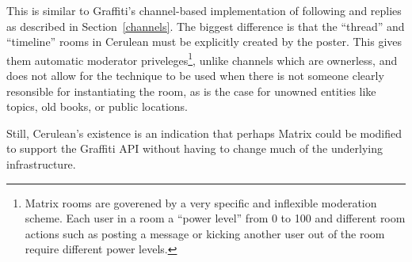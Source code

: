 

This is similar to Graffiti's channel-based implementation of following
and replies as described in Section~\ref{channels}.
The biggest difference is that the ``thread'' and ``timeline'' rooms
in Cerulean
must be explicitly created by the poster.
This gives them automatic moderator priveleges\footnote{
    Matrix rooms are goverened by a very specific and inflexible moderation scheme.
    Each user in a room a ``power level'' from 0 to 100 and
    different room actions such as posting a message or kicking
    another user out of the room require different power levels.
},
unlike channels which are ownerless,
and does not allow for the technique to be used
when there is not someone clearly resonsible for instantiating the room,
as is the case for unowned entities like topics, old books, or public locations.

Still, Cerulean's existence is an indication that perhaps
Matrix could be modified to support the Graffiti API without having
to change much of the underlying infrastructure.





